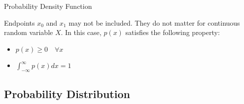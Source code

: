 \documentclass[aspectratio=169,xcolor=dvipsnames,svgnames,x11names,fleqn]{beamer}
\begin{document}
\begin{frame}[containsverbatim]{Probability Density Function}
    
    

    Endpoints ${x_0}$ and ${x_1}$ may not be included. They do not matter for continuous random variable $X$. In this case, $p(x)$ satisfies the following property:
    \begin{itemize}
        \item $p(x) \geq 0 \quad \forall x$
        \item $\int_{-\infty}^\infty p(x) dx = 1$
    \end{itemize}
  

    \end{frame}
    

\subsection{Probability Distribution}
\begin{frame}
    \subsectionpage
\end{frame}
\end{document}
